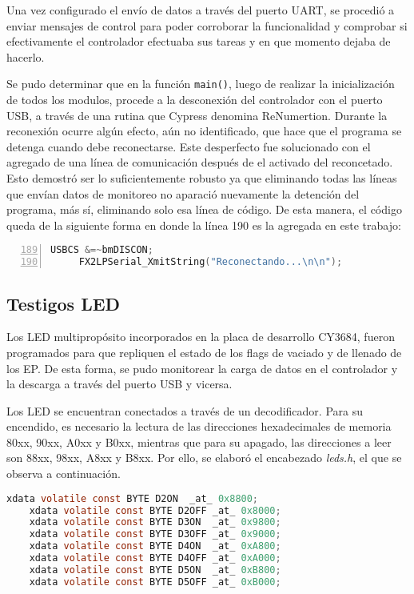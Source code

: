 Una vez configurado el envío de datos a través del puerto UART, se procedió a enviar mensajes de control para poder corroborar la funcionalidad y comprobar si efectivamente el controlador efectuaba sus tareas y en que momento dejaba de hacerlo.

Se pudo determinar que en la función \verb|main()|, luego de realizar la inicialización de todos los modulos, procede a la desconexión del controlador con el puerto USB, a través de una rutina que Cypress denomina ReNumertion\cite{CypressSemiconductor2014fx2lp}. Durante la reconexión ocurre algún efecto, aún no identificado, que hace que el programa se detenga cuando debe reconectarse. Este desperfecto fue solucionado con el agregado de una línea de comunicación después de el activado del reconcetado. Esto demostró ser lo suficientemente robusto ya que eliminando todas las  líneas que envían datos de monitoreo no aparació nuevamente la detención del programa, más sí, eliminando solo esa línea de código. De esta manera, el código queda de la siguiente forma en donde la línea 190 es la agregada en este trabajo:

\begin{lstlisting}[language=C,backgroundcolor=\color{gray!30},numbers=left,firstnumber=189,basicstyle=\footnotesize]
	 USBCS &=~bmDISCON;
	 FX2LPSerial_XmitString("Reconectando...\n\n");
\end{lstlisting}

\subsection{Testigos LED}
Los LED multipropósito incorporados en la placa de desarrollo CY3684, fueron programados para que repliquen el estado de los flags de vaciado y de llenado de los EP. De esta forma, se pudo monitorear la carga de datos en el controlador y la descarga a través del puerto USB y vicersa.

Los LED se encuentran conectados a través de un decodificador. Para su encendido, es necesario la lectura de las direcciones hexadecimales de memoria 80xx, 90xx, A0xx y B0xx, mientras que para su apagado, las direcciones a leer son  88xx, 98xx, A8xx y B8xx\cite{CypressSemiconductor2014cy3684}. Por ello, se elaboró el encabezado {\it leds.h}, el que se observa a continuación.
	
	\begin{lstlisting}[language=C,backgroundcolor=\color{gray!30}]
	xdata volatile const BYTE D2ON	_at_ 0x8800;
	xdata volatile const BYTE D2OFF	_at_ 0x8000;
	xdata volatile const BYTE D3ON	_at_ 0x9800;
	xdata volatile const BYTE D3OFF	_at_ 0x9000;
	xdata volatile const BYTE D4ON	_at_ 0xA800;
	xdata volatile const BYTE D4OFF	_at_ 0xA000;
	xdata volatile const BYTE D5ON	_at_ 0xB800;
	xdata volatile const BYTE D5OFF	_at_ 0xB000;	\end{lstlisting}
	
